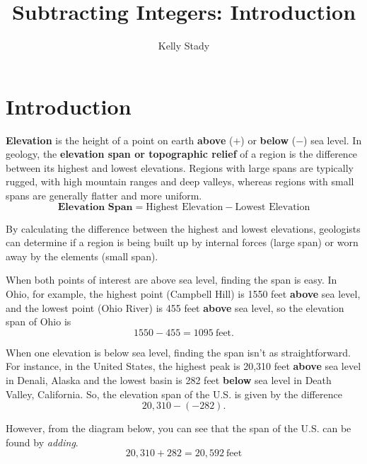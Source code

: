 \documentclass{ximera}[font=12pt]
\title{Subtracting Integers:  Introduction}   %
\author{Kelly Stady}
\begin{document}
\begin{abstract}

\end{abstract}

\maketitle
\label{xim:SubtractInt}


\section*{Introduction}

\textbf{Elevation} is the height of a point on earth \textbf{above} ($+$) or \textbf{below} ($-$) sea level.  In geology, the \textbf{elevation span or topographic relief} of a region is the difference between its highest and lowest elevations. Regions with large spans are typically rugged, with high mountain ranges and deep valleys, whereas regions with small spans are generally flatter and more uniform.
\[ \textbf{Elevation Span} = \textrm{Highest Elevation} - \textrm{Lowest Elevation} \]

By calculating the difference between the highest and lowest elevations, geologists can determine if a region is being built up by internal forces (large span) or worn away by the elements (small span).

When both points of interest are above sea level, finding the span is easy.  In Ohio, for example, the highest point (Campbell Hill) is 1550 
feet \textbf{above} sea level, and the lowest point (Ohio River) is 455 feet \textbf{above} sea level, so the elevation span of Ohio is
\[ 1550 - 455 = 1095 \ \textrm{feet}. \]

When one elevation is below sea level, finding the span isn't as straightforward.  For instance, in the United States, the highest peak is 
20,310 feet \textbf{above} sea level in Denali, Alaska and the lowest basin is 282 feet \textbf{below} sea level in Death Valley, California.  
So, the elevation span of the U.S. is given by the difference
\[ 20,310 - (-282). \]

However, from the diagram below, you can see that the span of the U.S. can be found by \emph{adding}.
\[ 20,310 + 282 = 20,592 \ \textrm{feet} \]
\end{document}
